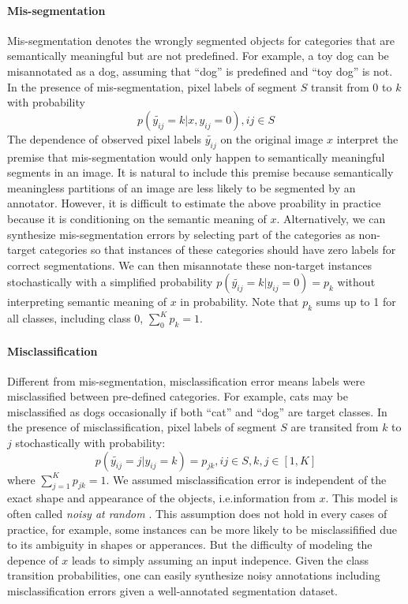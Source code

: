 \paragraph{Mis-segmentation}
\noindent
Mis-segmentation denotes the wrongly segmented objects for categories that are semantically meaningful but are not predefined.
For example, a toy dog can be misannotated as a dog, assuming that ``dog'' is predefined and ``toy dog'' is not.
In the presence of mis-segmentation, pixel labels of segment $S$ transit from $0$ to $k$ with probability
$$p(\tilde{y_{ij}}=k \vert x, y_{ij}=0), ij \in S $$
The dependence of observed pixel labels $\tilde{y_{ij}}$ on the original image $x$ interpret the premise that mis-segmentation would only happen to semantically meaningful segments in an image.
It is natural to include this premise because semantically meaningless partitions of an image are less likely to be segmented by an annotator.
However, it is difficult to estimate the above proability in practice because it is conditioning on the semantic meaning of $x$.
Alternatively, we can synthesize mis-segmentation errors by selecting part of the categories as non-target categories so that instances of these categories should have zero labels for correct segmentations.
We can then misannotate these non-target instances stochastically with a simplified probability $p(\tilde{y_{ij}}=k \vert y_{ij}=0)=p_k$ without  interpreting semantic meaning of $x$ in probability.
Note that $p_k$ sums up to 1 for all classes, including class 0, $\sum_0^K p_k = 1$.

\noindent
\paragraph{Misclassification}
Different from mis-segmentation, misclassification error means labels were misclassified between pre-defined categories.
For example, cats may be misclassified as dogs occasionally if both ``cat'' and ``dog'' are target classes.
In the presence of misclassification, pixel labels of segment $S$ are transited from $k$ to $j$ stochastically with probability:
$$p(\tilde{y_{ij}}=j \vert y_{ij}=k) = p_{jk}, ij \in S, k,j \in [1,K]$$
where $\sum_{j=1}^{K}p_{jk}=1$.
We assumed misclassification error is independent of the exact shape and appearance of the objects, i.e.information from $x$.
This model is often called \textit{noisy at random} \cite{frenay2014classification}.
This assumption does not hold in every cases of practice, for example, some instances can be more likely to be misclassifified due to its ambiguity in shapes or apperances.
But the difficulty of modeling the depence of $x$ leads to simply assuming an input indepence.
Given the class transition probabilities, one can easily synthesize noisy annotations including misclassification errors given a well-annotated segmentation dataset.

